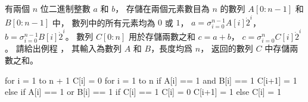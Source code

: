 \startEXERCISE
有兩個 $n$ 位二進制整數 $a$ 和 $b$，
存儲在兩個元素數目為 $n$ 的數列 $A[0:n-1]$ 和 $B[0:n-1]$ 中，
數列中的所有元素均為 $0$ 或 $1$，
$a = \sigma_{i=0}^{n-1}A[i]\dot 2^i$，
$b = \sigma_{i=0}^{n-1}B[i]\dot 2^i$。
數列 $C[0:n]$ 用於存儲兩數之和 $c=a+b$，
$c = \sigma_{i=0}^{n}C[i]\dot 2^i$。
請給出例程 ，
其輸入為數列 $A$ 和 $B$，長度均爲 $n$，
返回的數列 $C$ 中存儲兩數之和。
\stopEXERCISE
\startANSWER

\startCLRS
for i = 1 to n + 1
	C[i] = 0
for i = 1 to n
	if A[i] == 1 and B[i] == 1
		C[i+1] = 1
	else if A[i] == 1 or B[i] == 1
		if C[i] == 1
			C[i] = 0
			C[i+1] = 1
		else
			C[i] = 1
\stopCLRS

\stopANSWER

\stopsection
